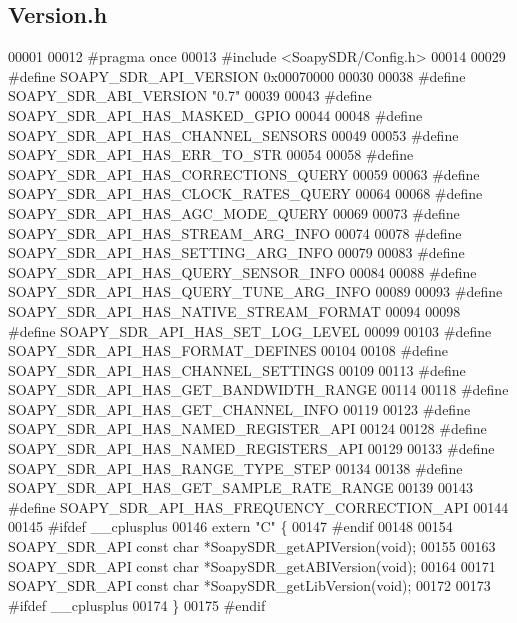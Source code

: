 \subsection{Version.\+h}
\label{Version_8h_source}

\begin{DoxyCode}
00001 
00012 \textcolor{preprocessor}{#pragma once}
00013 \textcolor{preprocessor}{#include <SoapySDR/Config.h>}
00014 
00029 \textcolor{preprocessor}{#define SOAPY\_SDR\_API\_VERSION 0x00070000}
00030 
00038 \textcolor{preprocessor}{#define SOAPY\_SDR\_ABI\_VERSION "0.7"}
00039 
00043 \textcolor{preprocessor}{#define SOAPY\_SDR\_API\_HAS\_MASKED\_GPIO}
00044 
00048 \textcolor{preprocessor}{#define SOAPY\_SDR\_API\_HAS\_CHANNEL\_SENSORS}
00049 
00053 \textcolor{preprocessor}{#define SOAPY\_SDR\_API\_HAS\_ERR\_TO\_STR}
00054 
00058 \textcolor{preprocessor}{#define SOAPY\_SDR\_API\_HAS\_CORRECTIONS\_QUERY}
00059 
00063 \textcolor{preprocessor}{#define SOAPY\_SDR\_API\_HAS\_CLOCK\_RATES\_QUERY}
00064 
00068 \textcolor{preprocessor}{#define SOAPY\_SDR\_API\_HAS\_AGC\_MODE\_QUERY}
00069 
00073 \textcolor{preprocessor}{#define SOAPY\_SDR\_API\_HAS\_STREAM\_ARG\_INFO}
00074 
00078 \textcolor{preprocessor}{#define SOAPY\_SDR\_API\_HAS\_SETTING\_ARG\_INFO}
00079 
00083 \textcolor{preprocessor}{#define SOAPY\_SDR\_API\_HAS\_QUERY\_SENSOR\_INFO}
00084 
00088 \textcolor{preprocessor}{#define SOAPY\_SDR\_API\_HAS\_QUERY\_TUNE\_ARG\_INFO}
00089 
00093 \textcolor{preprocessor}{#define SOAPY\_SDR\_API\_HAS\_NATIVE\_STREAM\_FORMAT}
00094 
00098 \textcolor{preprocessor}{#define SOAPY\_SDR\_API\_HAS\_SET\_LOG\_LEVEL}
00099 
00103 \textcolor{preprocessor}{#define SOAPY\_SDR\_API\_HAS\_FORMAT\_DEFINES}
00104 
00108 \textcolor{preprocessor}{#define SOAPY\_SDR\_API\_HAS\_CHANNEL\_SETTINGS}
00109 
00113 \textcolor{preprocessor}{#define SOAPY\_SDR\_API\_HAS\_GET\_BANDWIDTH\_RANGE}
00114 
00118 \textcolor{preprocessor}{#define SOAPY\_SDR\_API\_HAS\_GET\_CHANNEL\_INFO}
00119 
00123 \textcolor{preprocessor}{#define SOAPY\_SDR\_API\_HAS\_NAMED\_REGISTER\_API}
00124 
00128 \textcolor{preprocessor}{#define SOAPY\_SDR\_API\_HAS\_NAMED\_REGISTERS\_API}
00129 
00133 \textcolor{preprocessor}{#define SOAPY\_SDR\_API\_HAS\_RANGE\_TYPE\_STEP}
00134 
00138 \textcolor{preprocessor}{#define SOAPY\_SDR\_API\_HAS\_GET\_SAMPLE\_RATE\_RANGE}
00139 
00143 \textcolor{preprocessor}{#define SOAPY\_SDR\_API\_HAS\_FREQUENCY\_CORRECTION\_API}
00144 
00145 \textcolor{preprocessor}{#ifdef \_\_cplusplus}
00146 \textcolor{keyword}{extern} \textcolor{stringliteral}{"C"} \{
00147 \textcolor{preprocessor}{#endif}
00148 
00154 SOAPY_SDR_API \textcolor{keyword}{const} \textcolor{keywordtype}{char} *SoapySDR_getAPIVersion(\textcolor{keywordtype}{void});
00155 
00163 SOAPY_SDR_API \textcolor{keyword}{const} \textcolor{keywordtype}{char} *SoapySDR_getABIVersion(\textcolor{keywordtype}{void});
00164 
00171 SOAPY_SDR_API \textcolor{keyword}{const} \textcolor{keywordtype}{char} *SoapySDR_getLibVersion(\textcolor{keywordtype}{void});
00172 
00173 \textcolor{preprocessor}{#ifdef \_\_cplusplus}
00174 \}
00175 \textcolor{preprocessor}{#endif}
\end{DoxyCode}
